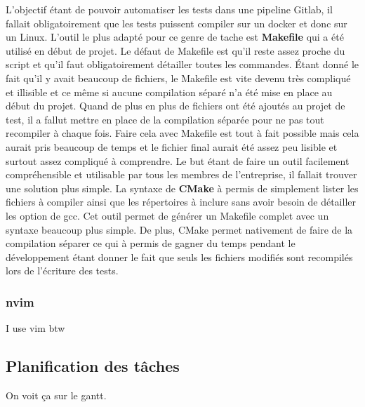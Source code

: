 \documentclass[a4paper]{article}
\begin{document}
L'objectif étant de pouvoir automatiser les tests dans une pipeline Gitlab, il
fallait obligatoirement que les tests puissent compiler sur un docker et donc
sur un Linux. L'outil le plus adapté pour ce genre de tache est
\textbf{Makefile} qui a été utilisé en début de projet. Le défaut de Makefile
est qu'il reste assez proche du script et qu'il faut obligatoirement détailler
toutes les commandes. Étant donné le fait qu'il y avait beaucoup de fichiers, le
Makefile est vite devenu très compliqué et illisible et ce même si aucune
compilation séparé n'a été mise en place au début du projet. Quand de plus en
plus de fichiers ont été ajoutés au projet de test, il a fallut mettre en place
de la compilation séparée pour ne pas tout recompiler à chaque fois. Faire cela
avec Makefile est tout à fait possible mais cela aurait pris beaucoup de temps     %
et le fichier final aurait été assez peu lisible et surtout assez compliqué à
comprendre. Le but étant de faire un outil facilement compréhensible et
utilisable par tous les membres de l'entreprise, il fallait trouver une solution
plus simple. La syntaxe de \textbf{CMake} à permis de simplement lister les
fichiers à compiler ainsi que les répertoires à inclure sans avoir besoin de
détailler les option de gcc. Cet outil permet de générer un Makefile complet
avec un syntaxe beaucoup plus simple. De plus, CMake permet nativement de faire
de la compilation séparer ce qui à permis de gagner du temps pendant le
développement étant donner le fait que seuls les fichiers modifiés sont
recompilés lors de l'écriture des tests.

\subsubsection{nvim}

I use vim btw


\subsection{Planification des tâches}

On voit ça sur le gantt.
\end{document}
